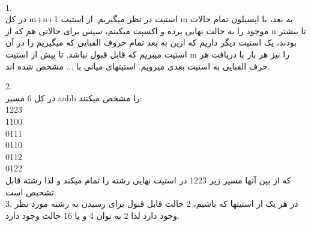 
\\
1.
\\
در کل m+n+1 استیت در نظر میگیریم. از استیت m به بعد، با اپسیلون تمام حالات موجود را به حالت نهایی برده و اکسپت میکینم،  سپس برای حالاتی هم که از n تا بیشتر بودند، یک استیت دیگر داریم که ازین به بعد تمام حروف الفبایی که میگیریم را در آن استیت میبریم که قابل قبول نباشد.
تا پیش از استیت m را نیز هر 
بار با دریافت هر حرف الفبایی به استیت بعدی میرویم.
استیتهای میانی با ... مشخص شده اند.
\\
\newpage



2.
\\
در کل 6 مسیر aabb را مشخص میکنند:
\\
1223
\\
1100
\\
0111
\\
0110
\\
0112
\\
0122\\
که از بین آنها مسیر زیر 1223 در استیت نهایی رشته را تمام میکند و لذا رشته قابل تشخیص است.
\\
3.
در هر یک از استیتها که باشیم، 2 حالت قابل قبول برای رسیدن به رشته مورد نظر وجود دارد لذا 2 به توان 4 و یا 16 حالت وجود دارد.

